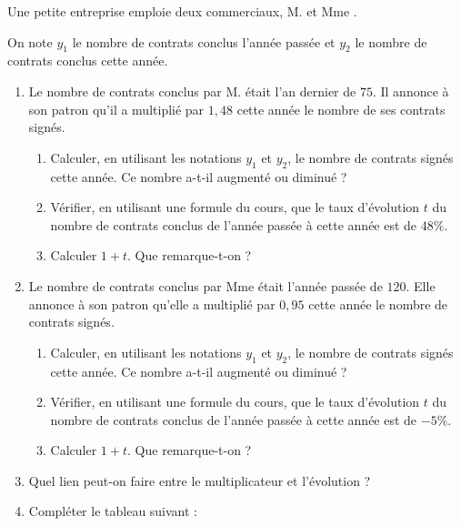 \documentclass[10pt,openright,twoside,french]{book}
\begin{document}

Une petite entreprise emploie deux commerciaux, M.  et Mme .\par
On note $y_1$ le nombre de contrats conclus l'année passée et $y_2$ le nombre de contrats conclus cette année.\medskip

\begin{enumerate}
    \item Le nombre de contrats conclus par M.  était l'an dernier de $75$. Il annonce à son patron qu'il a multiplié par $1{,}48$ cette année le nombre de ses contrats signés.
        \begin{enumerate}
            \item Calculer, en utilisant les notations $y_1$ et $y_2$, le nombre de contrats signés cette année. Ce nombre a-t-il augmenté ou diminué ?
            \item Vérifier, en utilisant une formule du cours, que le taux d'évolution $t$ du nombre de contrats conclus de l'année passée à cette année est de $48\%$.
            \item Calculer $1+t$. Que remarque-t-on ?
        \end{enumerate}\smallskip
    \item Le nombre de contrats conclus par Mme  était l'année passée de $120$. Elle annonce à son patron qu'elle a multiplié par $0{,}95$ cette année le nombre de contrats signés.
        \begin{enumerate}
            \item Calculer, en utilisant les notations $y_1$ et $y_2$, le nombre de contrats signés cette année. Ce nombre a-t-il augmenté ou diminué ?
            \item Vérifier, en utilisant une formule du cours, que le taux d'évolution $t$ du nombre de contrats conclus de l'année passée à cette année est de $-5\%$.
            \item Calculer $1+t$. Que remarque-t-on ?
        \end{enumerate}\smallskip
    \item Quel lien peut-on faire entre le \coef multiplicateur et l'évolution ?\smallskip
    \item Compléter le tableau suivant :
    

\end{enumerate}
\end{document}
